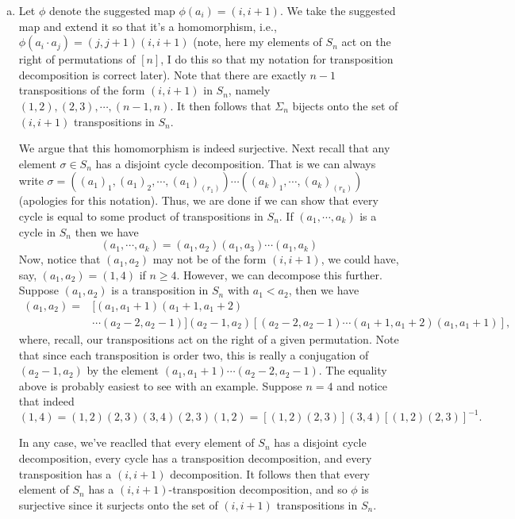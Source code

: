 \documentclass[12pt,letterpaper,boxed]{hmcpset}
\newcommand{\inv}{^{-1}}
\begin{document}
\begin{solution}
\begin{enumerate}[(a)]
\item Let $\phi$ denote the suggested map $\phi(a_i) = (i, i+1)$. We
take the suggested map and extend it so that it's a homomorphism,
i.e., $\phi(a_i \cdot a_j) = (j,j+1)(i,i+1)$ (note, here my elements
of $S_n$ act on the right of permutations of $[n]$, I do this so that
my notation for transposition decomposition is correct later). 
Note that there are exactly $n-1$ transpositions of the form $(i,i+1)$
in $S_n$, namely $(1,2), (2,3), \cdots, (n-1, n)$. It then follows
that $\Sigma_n$ bijects onto the set of $(i,i+1)$ transpositions in
$S_n$. 

We argue that this
homomorphism is indeed surjective.
Next recall that any
element $\sigma \in S_n$ has a disjoint cycle decomposition. That is we can
always write $\sigma = ((a_1)_1, (a_1)_2, \cdots, (a_1)_(r_1)) \cdots ((a_k)_1,
\cdots, (a_k)_(r_k))$ (apologies for this notation). Thus, we are done
if we can show that every cycle is equal to some product of
transpositions in $S_n$. If $(a_1, \cdots, a_k)$ is a cycle in $S_n$
then we have \[
	(a_1, \cdots, a_k) = (a_1, a_2)(a_1, a_3) \cdots (a_1, a_k)
\]
Now, notice that $(a_1, a_2)$ may not be of the form $(i, i+1)$, we
could have, say, $(a_1, a_2) = (1, 4)$ if $n \geq 4$. However, we can
decompose this further. Suppose $(a_1, a_2)$ is a transposition in
$S_n$ with $a_1 < a_2$, then we have 
\begin{align*}
(a_1, a_2) = &[(a_1, a_1 + 1) (a_1+1, a_1 + 2) \\
			&\cdots (a_2 -2, a_2 -1)] (a_2 - 1, a_2) 
	[(a_2 - 2, a_2 -1) \cdots (a_1 + 1, a_1 + 2) (a_1, a_1+1)], 
\end{align*}
where, recall, our transpositions act on the right of a given
permutation. Note that since each transposition is order two, this is
really a conjugation of $(a_2 - 1, a_2)$ by the element $(a_1, a_1 +
1) \cdots (a_2 - 2, a_2 - 1)$. The equality above is probably easiest to see with an
example. Suppose $n = 4$ and notice that indeed \[
(1, 4) = (1,2) (2,3) (3,4) (2,3) (1,2) = [(1,2)(2,3)](3,4)[(1,2)(2,3)]\inv.
\]

In any case, we've reaclled that every element of $S_n$ has a disjoint
cycle decomposition, every cycle has a transposition decomposition,
and every transposition has a $(i,i+1)$ decomposition. It follows then
that every element of $S_n$ has a $(i,i+1)$-transposition
decomposition, and so $\phi$ is surjective since it surjects onto the
set of $(i,i+1)$ transpositions in $S_n$.


\end{enumerate}
\end{solution}
\end{document}
